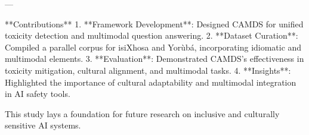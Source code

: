 ---

**Contributions**  
1. **Framework Development**: Designed CAMDS for unified toxicity detection and multimodal question answering.  
2. **Dataset Curation**: Compiled a parallel corpus for isiXhosa and Yorùbá, incorporating idiomatic and multimodal elements.  
3. **Evaluation**: Demonstrated CAMDS's effectiveness in toxicity mitigation, cultural alignment, and multimodal tasks.  
4. **Insights**: Highlighted the importance of cultural adaptability and multimodal integration in AI safety tools.  

This study lays a foundation for future research on inclusive and culturally sensitive AI systems.